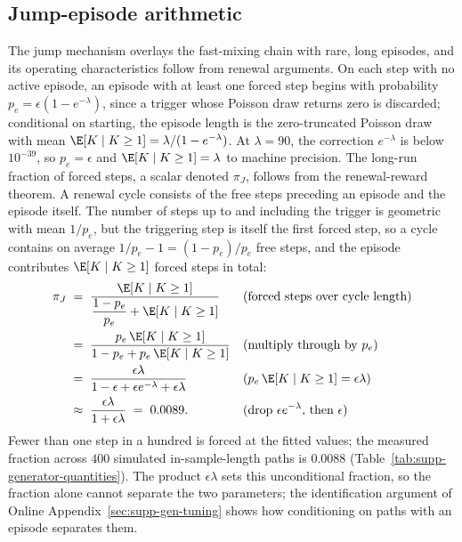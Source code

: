 \subsection{Jump-episode arithmetic}
\label{sec:supp-gen-renewal}

The jump mechanism overlays the fast-mixing chain with rare, long
episodes, and its operating characteristics follow from renewal
arguments. On each step with no active episode, an episode with at
least one forced step begins with probability
$p_e = \epsilon (1 - e^{-\lambda})$, since a trigger whose Poisson
draw returns zero is discarded; conditional on starting, the episode
length is the zero-truncated Poisson draw with mean
$\E[K \mid K \ge 1] = \lambda / (1 - e^{-\lambda})$. At $\lambda =
90$, the correction $e^{-\lambda}$ is below $10^{-39}$, so $p_e =
\epsilon$ and $\E[K \mid K \ge 1] = \lambda$ to machine precision.
The long-run fraction of forced steps, a scalar denoted $\pi_J$,
follows from the renewal-reward theorem. A renewal cycle consists of
the free steps preceding an episode and the episode itself. The number
of steps up to and including the trigger is geometric with mean
$1/p_e$, but the triggering step is itself the first forced step, so
a cycle contains on average $1/p_e - 1 = (1 - p_e)/p_e$ free steps,
and the episode contributes $\E[K \mid K \ge 1]$ forced steps in
total:
\begin{align}
  \pi_J
   &\;=\; \frac{\E[K \mid K \ge 1]}
     {\dfrac{1 - p_e}{p_e} + \E[K \mid K \ge 1]}
     && \text{(forced steps over cycle length)} \notag \\
   &\;=\; \frac{p_e\, \E[K \mid K \ge 1]}
     {1 - p_e + p_e\, \E[K \mid K \ge 1]}
     && \text{(multiply through by $p_e$)} \notag \\
   &\;=\; \frac{\epsilon \lambda}
     {1 - \epsilon + \epsilon e^{-\lambda} + \epsilon \lambda}
     && \text{($p_e\, \E[K \mid K \ge 1] = \epsilon \lambda$)} \notag \\
   &\;\approx\; \frac{\epsilon \lambda}{1 + \epsilon \lambda}
     \;=\; 0.0089.
     && \text{(drop $\epsilon e^{-\lambda}$, then $\epsilon$)}
  \label{eq:supp-rho}
\end{align}
Fewer than one step in a hundred is forced at the fitted values; the
measured fraction across $400$ simulated in-sample-length paths is
$0.0088$ (Table~\ref{tab:supp-generator-quantities}). The product
$\epsilon \lambda$ sets this unconditional fraction, so the fraction
alone cannot separate the two parameters; the identification argument
of Online Appendix~\ref{sec:supp-gen-tuning} shows how conditioning on
paths with an episode separates them.

